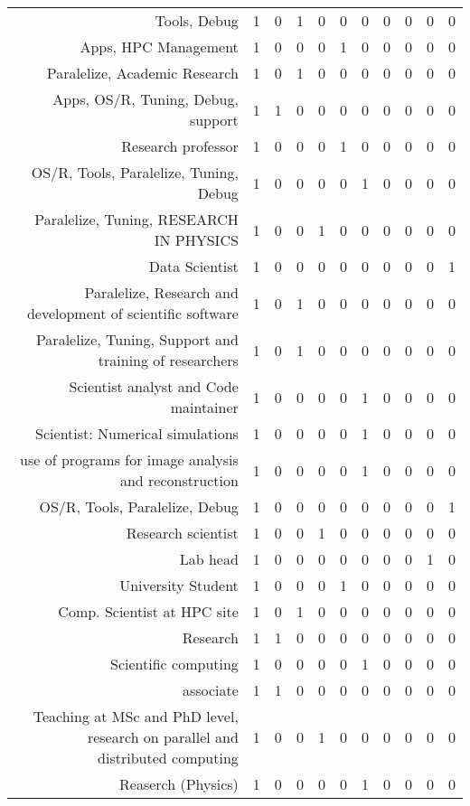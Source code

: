 {\begin{landscape}
\begin{longtable}[htb]{r|c|c|c|c|c|c|c|c|c|c}
{Tools, Debug} & 1 & 0 & 1 & 0 & 0 & 0 & 0 & 0 & 0 & 0 \\%
{Apps, HPC Management} & 1 & 0 & 0 & 0 & 1 & 0 & 0 & 0 & 0 & 0 \\%
{Paralelize, Academic Research} & 1 & 0 & 1 & 0 & 0 & 0 & 0 & 0 & 0 & 0 \\%
{Apps, OS/R, Tuning, Debug, support} & 1 & 1 & 0 & 0 & 0 & 0 & 0 & 0 & 0 & 0 \\%
{Research professor} & 1 & 0 & 0 & 0 & 1 & 0 & 0 & 0 & 0 & 0 \\%
{OS/R, Tools, Paralelize, Tuning, Debug} & 1 & 0 & 0 & 0 & 0 & 1 & 0 & 0 & 0 & 0 \\%
{Paralelize, Tuning, RESEARCH IN PHYSICS} & 1 & 0 & 0 & 1 & 0 & 0 & 0 & 0 & 0 & 0 \\%
{Data Scientist} & 1 & 0 & 0 & 0 & 0 & 0 & 0 & 0 & 0 & 1 \\%
{Paralelize, Research and development of scientific software} & 1 & 0 & 1 & 0 & 0 & 0 & 0 & 0 & 0 & 0 \\%
{Paralelize, Tuning, Support and training of researchers} & 1 & 0 & 1 & 0 & 0 & 0 & 0 & 0 & 0 & 0 \\%
{Scientist analyst and Code maintainer} & 1 & 0 & 0 & 0 & 0 & 1 & 0 & 0 & 0 & 0 \\%
{Scientist: Numerical simulations} & 1 & 0 & 0 & 0 & 0 & 1 & 0 & 0 & 0 & 0 \\%
{use of programs for image analysis and reconstruction} & 1 & 0 & 0 & 0 & 0 & 1 & 0 & 0 & 0 & 0 \\%
{OS/R, Tools, Paralelize, Debug} & 1 & 0 & 0 & 0 & 0 & 0 & 0 & 0 & 0 & 1 \\%
{Research scientist} & 1 & 0 & 0 & 1 & 0 & 0 & 0 & 0 & 0 & 0 \\%
{Lab head} & 1 & 0 & 0 & 0 & 0 & 0 & 0 & 0 & 1 & 0 \\%
{University Student} & 1 & 0 & 0 & 0 & 1 & 0 & 0 & 0 & 0 & 0 \\%
{Comp. Scientist at HPC site} & 1 & 0 & 1 & 0 & 0 & 0 & 0 & 0 & 0 & 0 \\%
{Research} & 1 & 1 & 0 & 0 & 0 & 0 & 0 & 0 & 0 & 0 \\%
{Scientific computing} & 1 & 0 & 0 & 0 & 0 & 1 & 0 & 0 & 0 & 0 \\%
{associate} & 1 & 1 & 0 & 0 & 0 & 0 & 0 & 0 & 0 & 0 \\%
{Teaching at MSc and PhD level, research on parallel and distributed computing} & 1 & 0 & 0 & 1 & 0 & 0 & 0 & 0 & 0 & 0 \\%
{Reaserch (Physics)} & 1 & 0 & 0 & 0 & 0 & 1 & 0 & 0 & 0 & 0 \\%

\end{longtable}
\end{landscape}}
